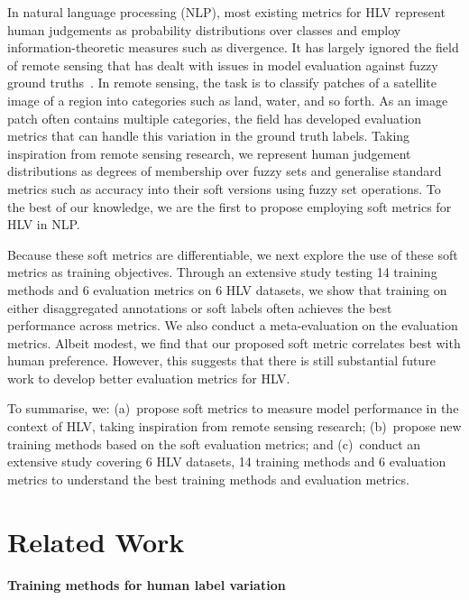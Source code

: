 \documentclass[shortpaper]{clv2025}
\begin{document}
In natural language processing (NLP), most existing metrics for HLV represent human judgements as probability
distributions over classes and employ information-theoretic measures such as
divergence. It has largely ignored the field of remote sensing that has dealt
with issues in model evaluation against fuzzy ground
truths~\citep{foody1996,binaghi1999,lewis2001,pontius2006,pontius2006a,silvan-cardenas2008,gomez2008}.
In remote sensing, the task is to classify patches of a satellite image of
a region into categories such as land, water, and so forth. As an image
patch often contains multiple categories, the field has developed evaluation
metrics that can handle this variation in the ground truth labels.
Taking inspiration from remote sensing research, we represent human
judgement distributions as degrees of membership over fuzzy sets and generalise
standard metrics such as accuracy into their soft versions using fuzzy set
operations. To the best of our knowledge, we are the first to propose employing soft
metrics for HLV in NLP.

Because these soft metrics are differentiable, we next explore the use of these soft metrics as training
objectives. Through an extensive study testing 14 training methods and 6
evaluation metrics on 6 HLV datasets, we show that training on either
disaggregated annotations or soft labels often achieves the best
performance across metrics. We also conduct a meta-evaluation on the evaluation metrics.
Albeit modest, we find that our proposed soft
metric correlates best with human preference. However, this
suggests that there is still substantial future work to develop better evaluation metrics for HLV.


To summarise, we: (a)~propose soft metrics to measure model performance in the context
of HLV, taking inspiration from remote sensing research; (b)~propose new
training methods based on the soft evaluation metrics; and (c)~conduct an
extensive study covering 6 HLV datasets, 14 training methods and 6 evaluation
metrics to understand the best training methods and evaluation metrics.

\section{Related Work}\label{sec:related-work}

\paragraph{Training methods for human label variation}
\end{document}
